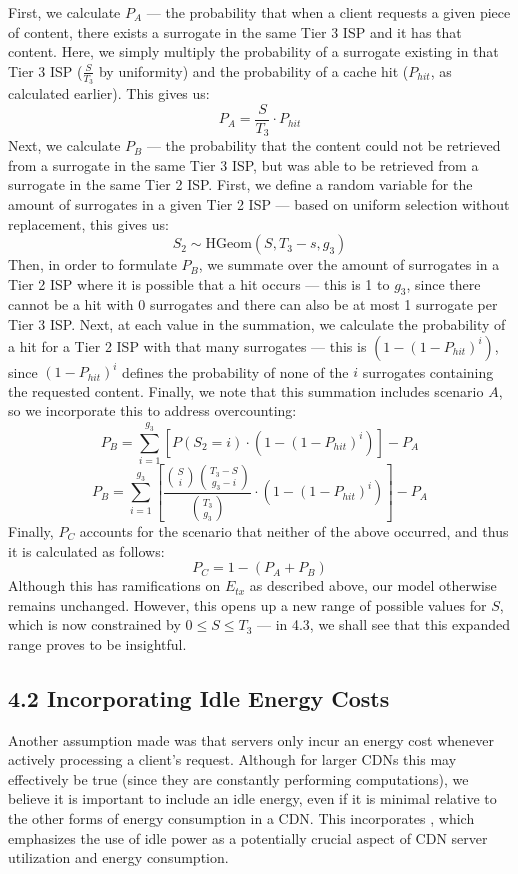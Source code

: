 \documentclass[
	a4paper, %
	10pt, %
	unnumberedsections, %
	twoside, %
]{LTJournalArticle}
\begin{document}
First, we calculate $P_A$ --- the probability that when a client requests a given piece of content, there exists a surrogate in the same Tier 3 ISP and it has that content. Here, we simply multiply the probability of a surrogate existing in that Tier 3 ISP ($\frac{S}{T_3}$ by uniformity) and the probability of a cache hit ($P_{hit}$, as calculated earlier). This gives us:
\[P_A = \frac{S}{T_3} \cdot P_{hit}\]
Next, we calculate $P_B$ --- the probability that the content could not be retrieved from a surrogate in the same Tier 3 ISP, but was able to be retrieved from a surrogate in the same Tier 2 ISP. First, we define a random variable for the amount of surrogates in a given Tier 2 ISP --- based on uniform selection without replacement, this gives us:
\[S_2 \sim \textrm{HGeom}(S, T_3-s, g_3)\]
Then, in order to formulate $P_B$, we summate over the amount of surrogates in a Tier 2 ISP where it is possible that a hit occurs --- this is 1 to $g_3$, since there cannot be a hit with 0 surrogates and there can also be at most 1 surrogate per Tier 3 ISP. Next, at each value in the summation, we calculate the probability of a hit for a Tier 2 ISP with that many surrogates --- this is $(1 - (1 - P_{hit})^i)$, since $(1 - P_{hit})^i$ defines the probability of none of the $i$ surrogates containing the requested content. Finally, we note that this summation includes scenario $A$, so we incorporate this to address overcounting:
\[P_B = \sum^{g_3}_{i=1}[P(S_2 = i) \cdot (1 - (1 - P_{hit})^i)] - P_A\]
\[P_B = \sum^{g_3}_{i=1}\left[\frac{\binom{S}{i}\binom{T_3-S}{g_3 - i}}{\binom{T_3}{g_3}} \cdot (1 - (1 - P_{hit})^i)\right] - P_A\]
Finally, $P_C$ accounts for the scenario that neither of the above occurred, and thus it is calculated as follows:
\[ P_C = 1 - (P_A + P_B)\]
Although this has ramifications on $E_{tx}$ as described above, our model otherwise remains unchanged. However, this opens up a new range of possible values for $S$, which is now constrained by $0 \leq S \leq T_3$ --- in 4.3, we shall see that this expanded range proves to be insightful.

\subsection{4.2 Incorporating Idle Energy Costs}
Another assumption made was that servers only incur an energy cost whenever actively processing a client's request. Although for larger CDNs this may effectively be true (since they are constantly performing computations),  we believe it is important to include an idle energy, even if it is minimal relative to the other forms of energy consumption in a CDN. This incorporates \cite{ulIslam2012}, which emphasizes the use of idle power as a potentially crucial aspect of CDN server utilization and energy consumption.
\end{document}
